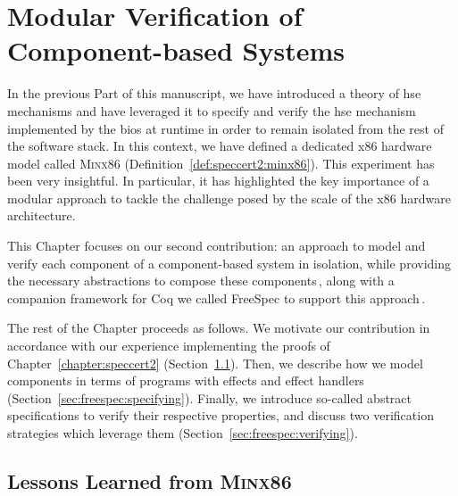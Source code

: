 \chapter{Modular Verification of Component-based Systems}
\label{chapter:freespec}


\vspace{1cm}%
\noindent
%
In the previous Part of this manuscript, we have introduced a theory of \ac{hse}
mechanisms and have leveraged it to specify and verify the \ac{hse} mechanism
implemented by the \ac{bios} at runtime in order to remain isolated from the
rest of the software stack.
%
In this context, we have defined a dedicated x86 hardware model called {\scshape
  Minx86} (Definition~\ref{def:speccert2:minx86}).
%
This experiment has been very insightful.
%
In particular, it has highlighted the key importance of a modular approach to
tackle the challenge posed by the scale of the x86 hardware architecture.
%

This Chapter focuses on our second contribution: an approach to model and verify
each component of a component-based system in isolation, while providing the
necessary abstractions to compose these components\,\cite{letan2018freespec},
along with a companion framework for Coq we called FreeSpec to support this
approach\,\cite{letan2018freespeccode}.

The rest of the Chapter proceeds as follows.
%
We motivate our contribution in accordance with our experience implementing the proofs of
Chapter~\ref{chapter:speccert2} (Section~\ref{sec:freespec:why}).
%
Then, we describe how we model components in terms of programs with effects and
effect handlers (Section~\ref{sec:freespec:specifying}).
%
Finally, we introduce so-called abstract specifications to verify their
respective properties, and discuss two verification strategies which leverage
them (Section~\ref{sec:freespec:verifying}).

\section{Lessons Learned from {\scshape Minx86}}
\label{sec:freespec:why}

